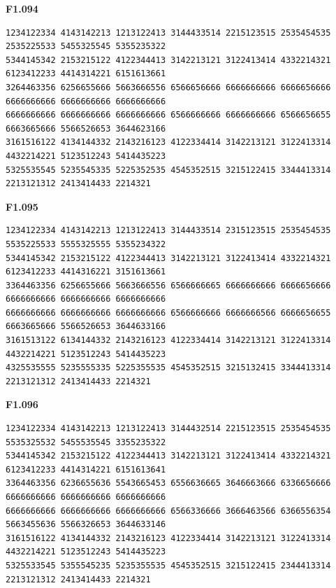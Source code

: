 \noindent\begin{minipage}{\linewidth}\textbf{F1.094}
\begin{lstlisting}
1234122334 4143142213 1213122413 3144433514 2215123515 2535454535 2535225533 5455325545 5355235322
5344145342 2153215122 4122344413 3142213121 3122413414 4332214321 6123412233 4414314221 6151613661
3264463356 6256655666 5663666556 6566656666 6666666666 6666656666 6666666666 6666666666 6666666666
6666666666 6666666666 6666666666 6566666666 6666666666 6566656655 6663665666 5566526653 3644623166
3161516122 4134144332 2143216123 4122334414 3142213121 3122413314 4432214221 5123512243 5414435223
5325535545 5235545335 5225352535 4545352515 3215122415 3344413314 2213121312 2413414433 2214321
\end{lstlisting}
\end{minipage}\par\smallskip

\noindent\begin{minipage}{\linewidth}\textbf{F1.095}
\begin{lstlisting}
1234122334 4143142213 1213122413 3144433514 2315123515 2535454535 5535225533 5555325555 5355234322
5344145342 2153215122 4122344413 3142213121 3122413414 4332214321 6123412233 4414316221 3151613661
3364463356 6256655666 5663666556 6566666665 6666666666 6666656666 6666666666 6666666666 6666666666
6666666666 6666666666 6666666666 6566666666 6666666566 6666656655 6663665666 5566526653 3644633166
3161513122 6134144332 2143216123 4122334414 3142213121 3122413314 4432214221 5123512243 5414435223
4325535555 5235555335 5225355535 4545352515 3215132415 3344413314 2213121312 2413414433 2214321
\end{lstlisting}
\end{minipage}\par\smallskip

\noindent\begin{minipage}{\linewidth}\textbf{F1.096}
\begin{lstlisting}
1234122334 4143142213 1213122413 3144432514 2215123515 2535454535 5535325532 5455535545 3355235322
5344145342 2153215122 4122344413 3142213121 3122413414 4332214321 6123412233 4414314221 6151613641
3364463356 6236655636 5543665453 6556636665 3646663666 6336656666 6666666666 6666666666 6666666666
6666666666 6666666666 6666666666 6566336666 3666463566 6366556354 5663455636 5566326653 3644633146
3161516122 4134144332 2143216123 4122334414 3142213121 3122413314 4432214221 5123512243 5414435223
5325533545 5355545235 5235355535 4545352515 3215122415 2344413314 2213121312 2413414433 2214321
\end{lstlisting}
\end{minipage}\par\smallskip

